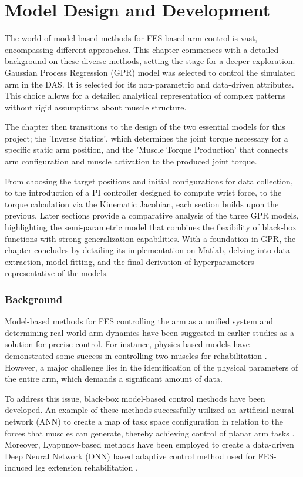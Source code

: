 \newpage
\chapter{Model Design and Development}\label{sec:model}
The world of model-based methods for FES-based arm control is vast, encompassing different approaches. This chapter commences with a detailed background on these diverse methods, setting the stage for a deeper exploration. Gaussian Process Regression (GPR) model was selected to control the simulated arm in the DAS. It is selected for its non-parametric and data-driven attributes. This choice allows for a detailed analytical representation of complex patterns without rigid assumptions about muscle structure. 

The chapter then transitions to the design of the two essential models for this project; the 'Inverse Statics', which determines the joint torque necessary for a specific static arm position, and the 'Muscle Torque Production' that connects arm configuration and muscle activation to the produced joint torque. 

From choosing the target positions and initial configurations for data collection, to the introduction of a PI controller designed to compute wrist force, to the torque calculation via the Kinematic Jacobian, each section builds upon the previous. Later sections provide a comparative analysis of the three GPR models, highlighting the semi-parametric model that  combines the flexibility of black-box functions with strong generalization capabilities. With a foundation in GPR, the chapter concludes by detailing its implementation on Matlab, delving into data extraction, model fitting, and the final derivation of hyperparameters representative of the models.

\subsection{Background}
Model-based methods for FES controlling the arm as a unified system and determining real-world arm dynamics have been suggested in earlier studies as a solution for precise control. For instance, physics-based models have demonstrated some success in controlling two muscles for rehabilitation \cite{IOL}. However, a major challenge lies in the identification of the physical parameters of the entire arm, which demands a significant amount of data.

To address this issue, black-box model-based control methods have been developed. An example of these methods successfully utilized an artificial neural network (ANN) to create a map of task space configuration in relation to the forces that muscles can generate, thereby achieving control of planar arm tasks \cite{FC2D}. Moreover, Lyapunov-based methods have been employed to create a data-driven Deep Neural Network (DNN) based adaptive control method used for FES-induced leg extension rehabilitation \cite{CLDNN}.

